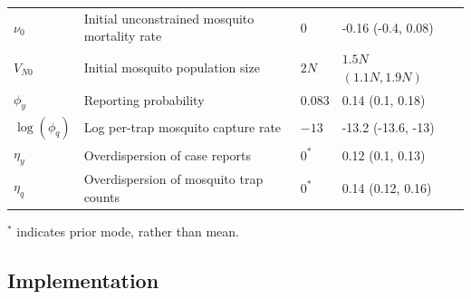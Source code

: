 \documentclass[10pt,letterpaper]{article}
\begin{document}
\begin{table}[!ht]
\begin{adjustwidth}{-2.25in}{0in}
\begin{center}
\begin{tabular}{lp{6cm}lll}
$\nu_0$ & Initial unconstrained mosquito mortality rate & 0 & -0.16 (-0.4, 0.08) &\\
$V_{N0}$ & Initial mosquito population size & $2N$ & $1.5N$ $(1.1N, 1.9N)$ &\\
$\phi_y$ & Reporting probability & 0.083 & 0.14  (0.1, 0.18) &\cite{Silva2016}\\
$\log(\phi_q)$ & Log per-trap mosquito capture rate & $-13$  & -13.2 (-13.6, -13)  &\\
$\eta_y$ & Overdispersion of case reports & $0^*$ & 0.12 (0.1, 0.13) &\\
$\eta_q$ & Overdispersion of mosquito trap counts & $0^*$ & 0.14 (0.12, 0.16)&\\
\end{tabular}
\end{center}
\end{adjustwidth}
$^*$ indicates prior mode, rather than mean.
\end{table}

\subsection*{Implementation}
\end{document}
